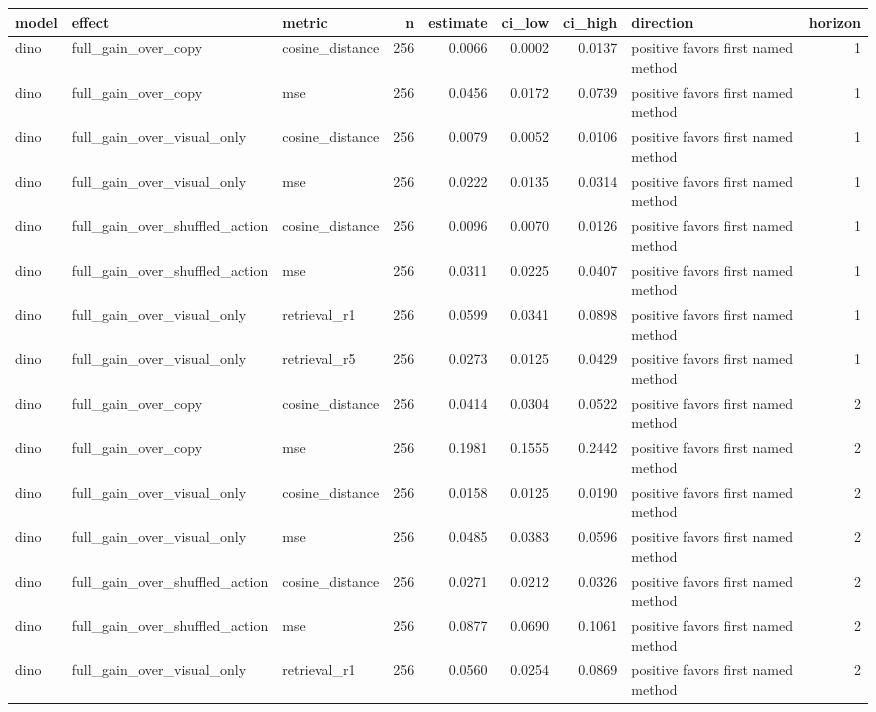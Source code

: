 \begin{tabular}{lllrrrrlr}
\toprule
model & effect & metric & n & estimate & ci\_low & ci\_high & direction & horizon \\
\midrule
dino & full\_gain\_over\_copy & cosine\_distance & 256 & 0.0066 & 0.0002 & 0.0137 & positive favors first named method & 1 \\
dino & full\_gain\_over\_copy & mse & 256 & 0.0456 & 0.0172 & 0.0739 & positive favors first named method & 1 \\
dino & full\_gain\_over\_visual\_only & cosine\_distance & 256 & 0.0079 & 0.0052 & 0.0106 & positive favors first named method & 1 \\
dino & full\_gain\_over\_visual\_only & mse & 256 & 0.0222 & 0.0135 & 0.0314 & positive favors first named method & 1 \\
dino & full\_gain\_over\_shuffled\_action & cosine\_distance & 256 & 0.0096 & 0.0070 & 0.0126 & positive favors first named method & 1 \\
dino & full\_gain\_over\_shuffled\_action & mse & 256 & 0.0311 & 0.0225 & 0.0407 & positive favors first named method & 1 \\
dino & full\_gain\_over\_visual\_only & retrieval\_r1 & 256 & 0.0599 & 0.0341 & 0.0898 & positive favors first named method & 1 \\
dino & full\_gain\_over\_visual\_only & retrieval\_r5 & 256 & 0.0273 & 0.0125 & 0.0429 & positive favors first named method & 1 \\
dino & full\_gain\_over\_copy & cosine\_distance & 256 & 0.0414 & 0.0304 & 0.0522 & positive favors first named method & 2 \\
dino & full\_gain\_over\_copy & mse & 256 & 0.1981 & 0.1555 & 0.2442 & positive favors first named method & 2 \\
dino & full\_gain\_over\_visual\_only & cosine\_distance & 256 & 0.0158 & 0.0125 & 0.0190 & positive favors first named method & 2 \\
dino & full\_gain\_over\_visual\_only & mse & 256 & 0.0485 & 0.0383 & 0.0596 & positive favors first named method & 2 \\
dino & full\_gain\_over\_shuffled\_action & cosine\_distance & 256 & 0.0271 & 0.0212 & 0.0326 & positive favors first named method & 2 \\
dino & full\_gain\_over\_shuffled\_action & mse & 256 & 0.0877 & 0.0690 & 0.1061 & positive favors first named method & 2 \\
dino & full\_gain\_over\_visual\_only & retrieval\_r1 & 256 & 0.0560 & 0.0254 & 0.0869 & positive favors first named method & 2 \\

\end{tabular}
